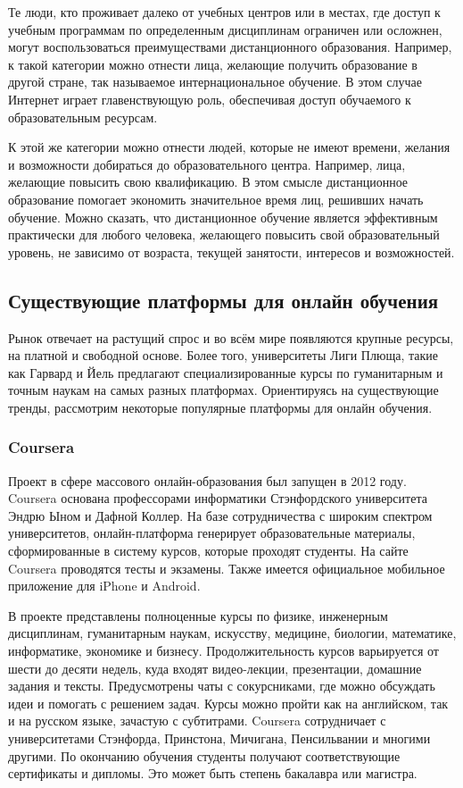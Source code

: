 Те люди, кто проживает далеко от учебных центров или в местах, где доступ к учебным программам по определенным дисциплинам ограничен
или осложнен, могут воспользоваться преимуществами дистанционного образования. Например, к такой категории можно
отнести лица, желающие получить образование в другой стране, так называемое интернациональное обучение.
В этом случае Интернет играет главенствующую роль, обеспечивая доступ обучаемого к образовательным ресурсам.

К этой же категории можно отнести людей, которые не имеют времени, желания и возможности добираться до
образовательного центра. Например, лица, желающие повысить свою квалификацию. В этом смысле дистанционное образование
помогает экономить значительное время лиц, решивших начать обучение. Можно сказать, что дистанционное обучение является
эффективным практически для любого человека, желающего повысить свой образовательный уровень, не зависимо от возраста,
текущей занятости, интересов и возможностей.

\subsection{Существующие платформы для онлайн обучения}

Рынок отвечает на растущий спрос и во всём мире появляются крупные ресурсы, на платной и
свободной основе. Более того, университеты Лиги Плюща, такие как Гарвард и Йель предлагают
специализированные курсы по гуманитарным и точным наукам на самых разных платформах. Ориентируясь
на существующие тренды, рассмотрим некоторые популярные платформы для онлайн обучения.

\subsubsection{Coursera}

Проект в сфере массового онлайн-образования был запущен в 2012 году. Coursera основана
профессорами информатики Стэнфордского университета Эндрю Ыном и Дафной Коллер.
На базе сотрудничества с широким спектром университетов, онлайн-платформа генерирует
образовательные материалы, сформированные в систему курсов, которые проходят студенты.
На сайте Coursera проводятся тесты и экзамены. Также имеется официальное мобильное
приложение для iPhone и Android.\cite{the-steppe}

В проекте представлены полноценные курсы по физике, инженерным дисциплинам, гуманитарным наукам,
искусству, медицине, биологии, математике, информатике, экономике и бизнесу.
Продолжительность курсов варьируется от шести до десяти недель, куда входят видео-лекции,
презентации, домашние задания и тексты. Предусмотрены чаты с сокурсниками, где можно обсуждать
идеи и помогать с решением задач. Курсы можно пройти как на английском, так и на русском языке,
зачастую с субтитрами. Coursera сотрудничает с университетами Стэнфорда, Принстона, Мичигана,
Пенсильвании и многими другими. По окончанию обучения студенты получают соответствующие
сертификаты и дипломы. Это может быть степень бакалавра или магистра.

